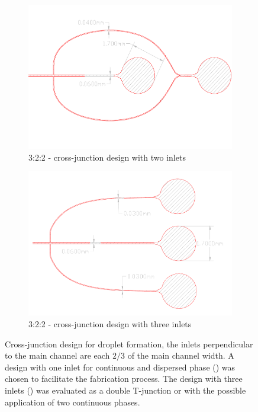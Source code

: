 \begin{figure}[h]
	\begin{subfigure}[l]{0.49\textwidth} 
		\centering
		\includegraphics[clip,trim={0mm 0mm 0mm 0mm}, scale=.22]{Ressourcen/IMG/Microfluidics_Prototype_3_2018412-Cross-junction2}
		\caption{3:2:2 - cross-junction design with two inlets}
		\label{fig:CAD:cross:2IN}
	\end{subfigure}
	\hfil
	\begin{subfigure}[r]{0.49\textwidth} 
		\centering
		\includegraphics[clip,trim={0mm 0mm 0mm 0mm},scale=.22]{Ressourcen/IMG/Microfluidics_Prototype_3_2018412-Cross-junction3}
		\caption{3:2:2 - cross-junction design with three inlets}
		\label{fig:CAD:cross:3IN}
	\end{subfigure}
	\caption{Cross-junction design for droplet formation, the inlets perpendicular to the main channel are each $2/3$ of the main channel width. A design with one inlet for continuous and dispersed phase (\protect{}) was chosen to facilitate the fabrication process. The design with three inlets (\protect{}) was evaluated as a double T-junction or with the possible application of two continuous phases.}
\end{figure}
